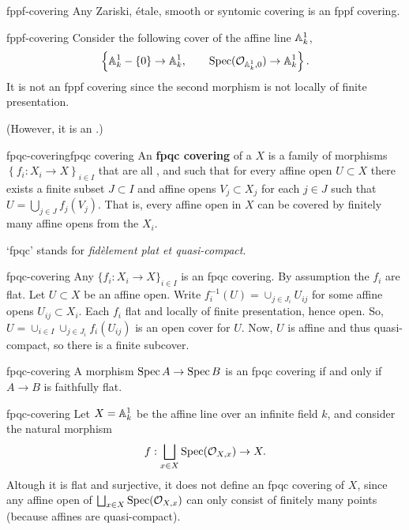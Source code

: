 \begin{example}{fppf-covering}
    Any Zariski, étale, smooth or syntomic covering is an fppf covering.
\end{example}

\begin{example}{fppf-covering}
    Consider the following cover of the affine line $\AA^1_k$,
    \[ \left\{ \AA^1_k - \{ 0 \} \to \AA^1_k, \qquad \Spec(\mathcal{O}_{\AA^1_k, 0}) \to \AA^1_k \right\} . \]
    It is not an fppf covering since the second morphism is not locally of finite presentation.
    
    (However, it is an .)
\end{example}

\begin{topic}{fpqc-covering}{fpqc covering}
    An \textbf{fpqc covering} of a  $X$ is a family of morphisms $\left\{ f_i : X_i \to X \right\}_{i \in I}$ that are all , and such that for every affine open $U \subset X$ there exists a finite subset $J \subset I$ and affine opens $V_j \subset X_j$ for each $j \in J$ such that $U = \bigcup_{j \in J} f_j(V_j)$. That is, every affine open in $X$ can be covered by finitely many affine opens from the $X_i$.
    
    `fpqc' stands for \textit{fidèlement plat et quasi-compact}.
\end{topic}

\begin{example}{fpqc-covering}
    Any  $\{ f_i : X_i \to X \}_{i \in I}$ is an fpqc covering. By assumption the $f_i$ are flat. Let $U \subset X$ be an affine open. Write $f_i^{-1}(U) = \cup_{j \in J_i} U_{ij}$ for some affine opens $U_{ij} \subset X_i$. Each $f_i$ flat and locally of finite presentation, hence open. So, $U = \cup_{i \in I} \cup_{j \in J_i} f_i(U_{ij})$ is an open cover for $U$. Now, $U$ is affine and thus quasi-compact, so there is a finite subcover.
\end{example}

\begin{example}{fpqc-covering}
    A morphism $\Spec A \to \Spec B$ is an fpqc covering if and only if $A \to B$ is faithfully flat.
\end{example}

\begin{example}{fpqc-covering}
    Let $X = \AA^1_k$ be the affine line over an infinite field $k$, and consider the natural morphism
    \[ f : \bigsqcup_{x \in X} \Spec(\mathcal{O}_{X, x}) \to X . \]
    Altough it is flat and surjective, it does not define an fpqc covering of $X$, since any affine open of $\bigsqcup_{x \in X} \Spec(\mathcal{O}_{X, x})$ can only consist of finitely many points (because affines are quasi-compact).
\end{example}

